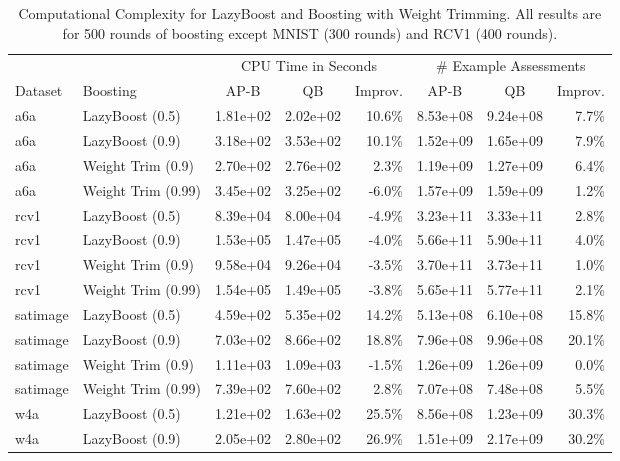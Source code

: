 \begin{table*}[ht]
\caption{Computational Complexity for LazyBoost and Boosting with Weight Trimming.
All results are for 500 rounds of boosting except MNIST (300 rounds) and RCV1 (400 rounds).}
\label{complexity-approx-results}	
\vskip 0.15in
\begin{center}
\begin{small}
\begin{sc}
\begin{tabular}{llccrccr}
\toprule
& & \multicolumn{3}{c}{CPU Time in Seconds} & \multicolumn{3}{c}{\# Example Assessments} \\
Dataset & Boosting & AP-B & QB & Improv. & AP-B & QB & Improv. \\
\midrule
a6a & LazyBoost (0.5) & 1.81e+02 & 2.02e+02 & 10.6\% & 8.53e+08 & 9.24e+08 & 7.7\% \\
a6a & LazyBoost (0.9) & 3.18e+02 & 3.53e+02 & 10.1\% & 1.52e+09 & 1.65e+09 & 7.9\% \\
a6a & Weight Trim (0.9) & 2.70e+02 & 2.76e+02 & 2.3\% & 1.19e+09 & 1.27e+09 & 6.4\% \\
a6a & Weight Trim (0.99) & 3.45e+02 & 3.25e+02 & -6.0\% & 1.57e+09 & 1.59e+09 & 1.2\% \\
\midrule
%
rcv1 & LazyBoost (0.5) & 8.39e+04 & 8.00e+04 & -4.9\% & 3.23e+11 & 3.33e+11 & 2.8\% \\
rcv1 & LazyBoost (0.9) & 1.53e+05 & 1.47e+05 & -4.0\% & 5.66e+11 & 5.90e+11 & 4.0\% \\
rcv1 & Weight Trim (0.9) & 9.58e+04 & 9.26e+04 & -3.5\% & 3.70e+11 & 3.73e+11 & 1.0\% \\
rcv1 & Weight Trim (0.99) & 1.54e+05 & 1.49e+05 & -3.8\% & 5.65e+11 & 5.77e+11 & 2.1\% \\
\midrule
%
satimage & LazyBoost (0.5) & 4.59e+02 & 5.35e+02 & 14.2\% & 5.13e+08 & 6.10e+08 & 15.8\% \\
satimage & LazyBoost (0.9) & 7.03e+02 & 8.66e+02 & 18.8\% & 7.96e+08 & 9.96e+08 & 20.1\% \\
satimage & Weight Trim (0.9) & 1.11e+03 & 1.09e+03 & -1.5\% & 1.26e+09 & 1.26e+09 & 0.0\% \\
satimage & Weight Trim (0.99) & 7.39e+02 & 7.60e+02 & 2.8\% & 7.07e+08 & 7.48e+08 & 5.5\% \\
\midrule
%
w4a & LazyBoost (0.5) & 1.21e+02 & 1.63e+02 & 25.5\% & 8.56e+08 & 1.23e+09 & 30.3\% \\
w4a & LazyBoost (0.9) & 2.05e+02 & 2.80e+02 & 26.9\% & 1.51e+09 & 2.17e+09 & 30.2\% \\

\end{tabular}
\end{sc}
\end{small}
\end{center}
\end{table*}
